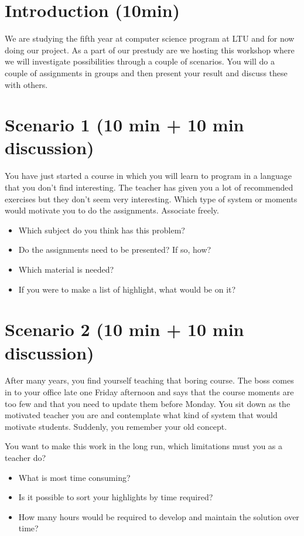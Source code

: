 \section*{Introduction (10min)}
We are studying the fifth year at computer science program at LTU and for now doing our project. As a part of our prestudy are we hosting this workshop where we will investigate possibilities through a couple of scenarios. You will do a couple of assignments in groups and then present your result and discuss these with others.

\section*{Scenario 1 (10 min + 10 min discussion)}
You have just started a course in which you will learn to program in a language that you don't find interesting. The teacher has given you a lot of recommended exercises but they don't seem very interesting. Which type of system or moments would motivate you to do the assignments. Associate freely.
\begin{itemize}
\item Which subject do you think has this problem?
\item Do the assignments need to be presented? If so, how?
\item Which material is needed?
\item If you were to make a list of highlight, what would be on it?
\end{itemize} 

\section*{Scenario 2 (10 min + 10 min discussion)}
After many years, you find yourself teaching that boring course. The boss comes in to your office late one Friday afternoon and says that the course moments are too few and that you need to update them before Monday. You sit down as the motivated teacher you are and contemplate what kind of system that would motivate students. Suddenly, you remember your old concept.

You want to make this work in the long run, which limitations must you as a teacher do?
\begin{itemize}
\item What is most time consuming?
\item Is it possible to sort your highlights by time required?
\item How many hours would be required to develop and maintain the solution over time?
\end{itemize} 

